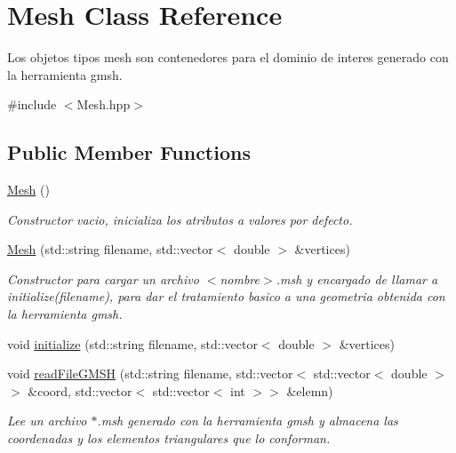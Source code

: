 \hypertarget{class_mesh}{}\section{Mesh Class Reference}
\label{class_mesh}


Los objetos tipos mesh son contenedores para el dominio de interes generado con la herramienta gmsh.  




{\ttfamily \#include $<$Mesh.\+hpp$>$}

\subsection*{Public Member Functions}
\begin{DoxyCompactItemize}
\item 
\hypertarget{class_mesh_a2af137f1571af89172b9c102302c416b}{}\label{class_mesh_a2af137f1571af89172b9c102302c416b} 
\hyperlink{class_mesh_a2af137f1571af89172b9c102302c416b}{Mesh} ()
\begin{DoxyCompactList}\small\item\em Constructor vacio, inicializa los atributos a valores por defecto. \end{DoxyCompactList}\item 
\hyperlink{class_mesh_a54a9cf0f6223e63253c8e9f8f99746b3}{Mesh} (std\+::string filename, std\+::vector$<$ double $>$ \&vertices)
\begin{DoxyCompactList}\small\item\em Constructor para cargar un archivo $<$nombre$>$.msh y encargado de llamar a initialize(filename), para dar el tratamiento basico a una geometria obtenida con la herramienta gmsh. \end{DoxyCompactList}\item 
void \hyperlink{class_mesh_afa6559daf1f8495fd0a796fb31370542}{initialize} (std\+::string filename, std\+::vector$<$ double $>$ \&vertices)
\item 
void \hyperlink{class_mesh_a0885d845bc4001d43d7d92a0a98a127a}{read\+File\+G\+M\+SH} (std\+::string filename, std\+::vector$<$ std\+::vector$<$ double $>$$>$ \&coord, std\+::vector$<$ std\+::vector$<$ int $>$$>$ \&elemn)
\begin{DoxyCompactList}\small\item\em Lee un archivo $\ast$.msh generado con la herramienta gmsh y almacena las coordenadas y los elementos triangulares que lo conforman. \end{DoxyCompactList}\item 

\end{DoxyCompactItemize}
